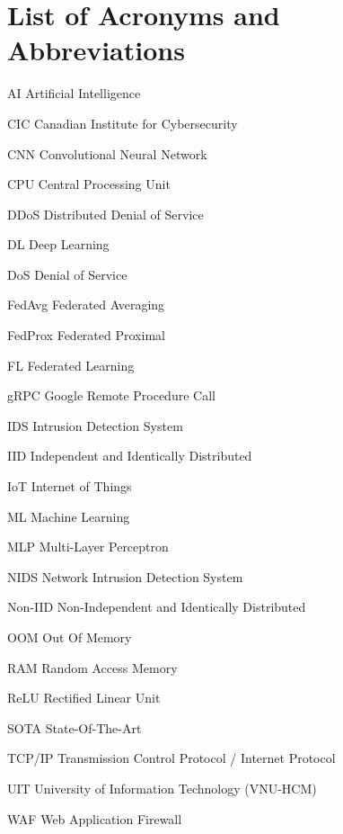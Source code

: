 \chapter*{List of Acronyms and Abbreviations}

\begin{acronyms}
    \item[AI] Artificial Intelligence
    \item[CIC] Canadian Institute for Cybersecurity
    \item[CNN] Convolutional Neural Network
    \item[CPU] Central Processing Unit
    \item[DDoS] Distributed Denial of Service
    \item[DL] Deep Learning
    \item[DoS] Denial of Service
    \item[FedAvg] Federated Averaging
    \item[FedProx] Federated Proximal
    \item[FL] Federated Learning
    \item[gRPC] Google Remote Procedure Call
    \item[IDS] Intrusion Detection System
    \item[IID] Independent and Identically Distributed
    \item[IoT] Internet of Things
    \item[ML] Machine Learning
    \item[MLP] Multi-Layer Perceptron
    \item[NIDS] Network Intrusion Detection System
    \item[Non-IID] Non-Independent and Identically Distributed
    \item[OOM] Out Of Memory
    \item[RAM] Random Access Memory
    \item[ReLU] Rectified Linear Unit
    \item[SOTA] State-Of-The-Art
    \item[TCP/IP] Transmission Control Protocol / Internet Protocol
    \item[UIT] University of Information Technology (VNU-HCM)
    \item[WAF] Web Application Firewall
\end{acronyms}
\newpage
